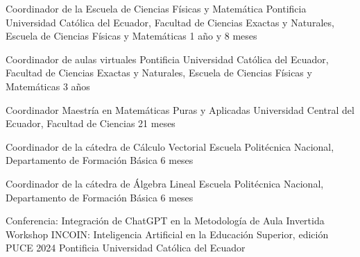 \documentclass[
	a4paper,
	maincolor=cvblue!70!blue,
	sidecolor=gray!30,
	sectioncolor=cvblue!70!blue,
    sidebarwidth=7.5cm,
	topbottommargin=20pt,
	leftrightmargin=20pt,
]{fortysecondscv}
\begin{document}

    {Coordinador de la Escuela de Ciencias Físicas y Matemática}
    {Pontificia Universidad Católica del Ecuador, Facultad de Ciencias Exactas y Naturales, Escuela de Ciencias Físicas y Matemáticas}
    {1 año y 8 meses}
    
    {Coordinador de aulas virtuales}
    {Pontificia Universidad Católica del Ecuador, Facultad de Ciencias Exactas y Naturales, Escuela de Ciencias Físicas y Matemáticas}
    {3 años}
    
    {Coordinador Maestría en Matemáticas Puras y Aplicadas}
    {Universidad Central del Ecuador, Facultad de Ciencias}
    {21 meses}
    
    {Coordinador de la cátedra de Cálculo Vectorial}
    {Escuela Politécnica Nacional, Departamento de Formación Básica}
    {6 meses}
    
    {Coordinador de la cátedra de Álgebra Lineal}
    {Escuela Politécnica Nacional, Departamento de Formación Básica}
    {6 meses}
    



\newpage
{}



    {Conferencia: Integración de ChatGPT en la Metodología de Aula Invertida}
    {Workshop INCOIN: Inteligencia Artificial en la Educación Superior, edición PUCE 2024}
    {Pontificia Universidad Católica del Ecuador}
    
\end{document}

